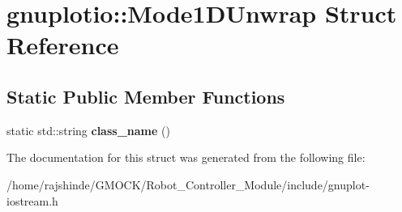 \hypertarget{structgnuplotio_1_1_mode1_d_unwrap}{}\section{gnuplotio\+:\+:Mode1\+D\+Unwrap Struct Reference}
\label{structgnuplotio_1_1_mode1_d_unwrap}
\subsection*{Static Public Member Functions}
\begin{DoxyCompactItemize}
\item 
static std\+::string {\bfseries class\+\_\+name} ()\hypertarget{structgnuplotio_1_1_mode1_d_unwrap_a2350096ad4d8b668f6df56c32cab69b6}{}\label{structgnuplotio_1_1_mode1_d_unwrap_a2350096ad4d8b668f6df56c32cab69b6}

\end{DoxyCompactItemize}


The documentation for this struct was generated from the following file\+:\begin{DoxyCompactItemize}
\item 
/home/rajshinde/\+G\+M\+O\+C\+K/\+Robot\+\_\+\+Controller\+\_\+\+Module/include/gnuplot-\/iostream.\+h\end{DoxyCompactItemize}

